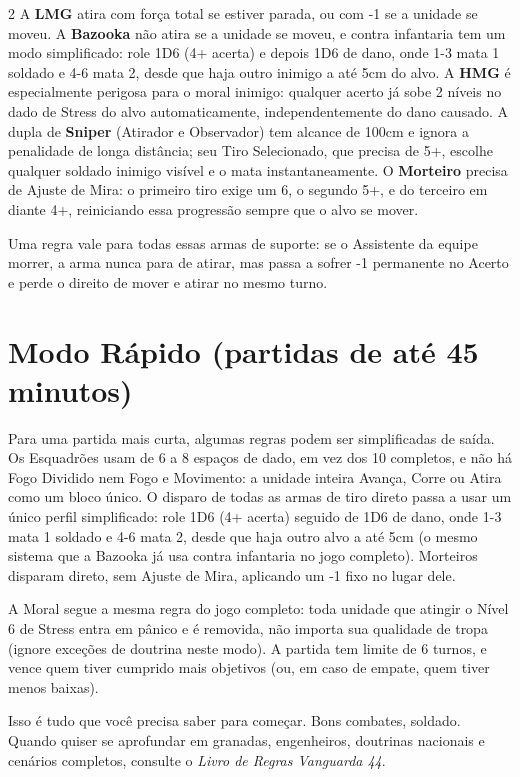 \documentclass[10pt]{article}
\begin{document}
\begin{multicols}{2}
A \textbf{LMG} atira com força total se estiver parada, ou com -1 se a unidade se moveu. A \textbf{Bazooka} não atira se a unidade se moveu, e contra infantaria tem um modo simplificado: role 1D6 (4+ acerta) e depois 1D6 de dano, onde 1-3 mata 1 soldado e 4-6 mata 2, desde que haja outro inimigo a até 5cm do alvo. A \textbf{HMG} é especialmente perigosa para o moral inimigo: qualquer acerto já sobe 2 níveis no dado de Stress do alvo automaticamente, independentemente do dano causado. A dupla de \textbf{Sniper} (Atirador e Observador) tem alcance de 100cm e ignora a penalidade de longa distância; seu Tiro Selecionado, que precisa de 5+, escolhe qualquer soldado inimigo visível e o mata instantaneamente. O \textbf{Morteiro} precisa de Ajuste de Mira: o primeiro tiro exige um 6, o segundo 5+, e do terceiro em diante 4+, reiniciando essa progressão sempre que o alvo se mover.

Uma regra vale para todas essas armas de suporte: se o Assistente da equipe morrer, a arma nunca para de atirar, mas passa a sofrer -1 permanente no Acerto e perde o direito de mover e atirar no mesmo turno.

\section{Modo Rápido (partidas de até 45 minutos)}

Para uma partida mais curta, algumas regras podem ser simplificadas de saída. Os Esquadrões usam de 6 a 8 espaços de dado, em vez dos 10 completos, e não há Fogo Dividido nem Fogo e Movimento: a unidade inteira Avança, Corre ou Atira como um bloco único. O disparo de todas as armas de tiro direto passa a usar um único perfil simplificado: role 1D6 (4+ acerta) seguido de 1D6 de dano, onde 1-3 mata 1 soldado e 4-6 mata 2, desde que haja outro alvo a até 5cm (o mesmo sistema que a Bazooka já usa contra infantaria no jogo completo). Morteiros disparam direto, sem Ajuste de Mira, aplicando um -1 fixo no lugar dele.

A Moral segue a mesma regra do jogo completo: toda unidade que atingir o Nível 6 de Stress entra em pânico e é removida, não importa sua qualidade de tropa (ignore exceções de doutrina neste modo). A partida tem limite de 6 turnos, e vence quem tiver cumprido mais objetivos (ou, em caso de empate, quem tiver menos baixas).

\bigskip
\noindent Isso é tudo que você precisa saber para começar. Bons combates, soldado. Quando quiser se aprofundar em granadas, engenheiros, doutrinas nacionais e cenários completos, consulte o \textit{Livro de Regras Vanguarda 44}.

\end{multicols}
\end{document}
